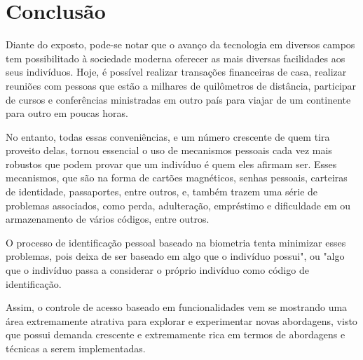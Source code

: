 \chapter{Conclusão}\label{cap:conclusoeseperspectivas}

Diante do exposto, pode-se notar que o avanço da tecnologia em diversos campos 
tem possibilitado à sociedade moderna oferecer as mais diversas facilidades aos 
seus indivíduos. Hoje, é possível realizar transações financeiras de casa, 
realizar reuniões com pessoas que estão a milhares de quilômetros de distância, 
participar de cursos e conferências ministradas em outro país para viajar de um 
continente para outro em poucas horas.

No entanto, todas essas conveniências, e um número crescente de quem tira proveito 
delas, tornou essencial o uso de mecanismos pessoais cada vez mais robustos que 
podem provar que um indivíduo é quem eles afirmam ser. Esses mecanismos, que são 
na forma de cartões magnéticos, senhas pessoais, carteiras de identidade, 
passaportes, entre outros, e, também trazem uma série de problemas associados, 
como perda, adulteração, empréstimo e dificuldade em ou armazenamento de vários 
códigos, entre outros.

O processo de identificação pessoal baseado na biometria tenta minimizar esses 
problemas, pois deixa de ser baseado em algo que o indivíduo possui", ou "algo que 
o indivíduo passa a considerar o próprio indivíduo como código de identificação.

Assim, o controle de acesso baseado em funcionalidades vem se mostrando uma área 
extremamente atrativa para explorar e experimentar novas abordagens, visto que 
possui demanda crescente e extremamente rica em termos de abordagens e técnicas a 
serem implementadas.
